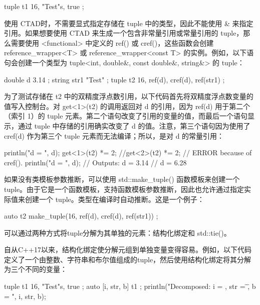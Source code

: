 \begin{cpp}
tuple t1 { 16, "Test"s, true };
\end{cpp}

使用 CTAD时，不需要显式指定存储在 tuple 中的类型，因此不能使用 \& 来指定引用。如果想要使用 CTAD 来生成一个包含非常量引用或常量引用的 tuple，那么需要使用 <functional> 中定义的 ref() 或 cref()，这些函数会创建 reference\_wrapper<T> 或 reference\_wrapper<const T> 的实例。例如，以下语句会创建一个类型为 tuple<int, double\&, const double\&, string\&> 的 tuple：

\begin{cpp}
double d { 3.14 };
string str1 { "Test" };
tuple t2 { 16, ref(d), cref(d), ref(str1) };
\end{cpp}

为了测试存储在 t2 中的双精度浮点数引用，以下代码首先将双精度浮点数变量的值写入控制台。对 get<1>(t2) 的调用返回对 d 的引用，因为 ref(d) 用于第二个（索引 1）的 tuple 元素。第二个语句改变了引用的变量的值，而最后一个语句显示，通过 tuple 中存储的引用确实改变了 d 的值。注意，第三个语句因为使用了 cref(d) 作为第三个 tuple 元素而无法编译；所以，是对 d 的常量引用：

\begin{cpp}
println("d = {}", d);
get<1>(t2) *= 2;
//get<2>(t2) *= 2; // ERROR because of cref().
println("d = {}", d);
// Outputs: d = 3.14
// d = 6.28
\end{cpp}

如果没有类模板参数推断，可以使用 std::make\_tuple() 函数模板来创建一个 tuple。由于它是一个函数模板，支持函数模板参数推断，因此也允许通过指定实际值来创建一个 tuple。类型在编译时自动推断。这是一个例子：

\begin{cpp}
auto t2 { make_tuple(16, ref(d), cref(d), ref(str1)) };
\end{cpp}


可以通过两种方式将tuple分解为其单独的元素：结构化绑定和 std::tie()。


自从C++17以来，结构化绑定使分解元组到单独变量变得容易。例如，以下代码定义了一个由整数、字符串和布尔值组成的tuple，然后使用结构化绑定将其分解为三个不同的变量：

\begin{cpp}
tuple t1 { 16, "Test"s, true };
auto [i, str, b] { t1 };
println("Decomposed: i = {}, str = \"{}\", b = {}", i, str, b);
\end{cpp}

